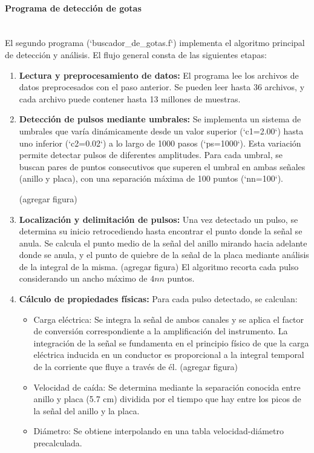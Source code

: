 \documentclass[12pt,a4paper]{article}
\newcommand{\subsubsubsection}[1]{\paragraph{#1}\mbox{}\\}
\begin{document}
\subsubsubsection{Programa de detección de gotas}

El segundo programa (`buscador\_de\_gotas.f`) implementa el algoritmo principal de
detección y análisis. El flujo general consta de las siguientes etapas:

\begin{enumerate}

\item \textbf{Lectura y preprocesamiento de datos:} El programa lee los archivos de datos
preprocesados con el paso anterior. Se pueden leer hasta 36 archivos, y cada archivo puede contener hasta 13 millones de muestras.

\item \textbf{Detección de pulsos mediante umbrales:} Se implementa un sistema de umbrales que varía dinámicamente desde un valor superior (`c1=2.00`) hasta
uno inferior (`c2=0.02`) a lo largo de 1000 pasos (`ps=1000`). Esta variación permite
detectar pulsos de diferentes amplitudes.
Para cada umbral, se buscan pares de puntos consecutivos que superen el umbral en ambas señales (anillo y placa), con una separación máxima de 100 puntos
(`nn=100`).

(agregar figura)

\item \textbf{Localización y delimitación de pulsos:} Una vez detectado un pulso, se determina su inicio retrocediendo hasta encontrar el punto donde la señal se anula. Se
calcula el punto medio de la señal del anillo mirando hacia adelante donde se anula, y el punto de quiebre de la señal de la placa mediante análisis de la integral de la misma. (agregar figura)
El algoritmo recorta cada pulso considerando un ancho máximo de $4nn$ puntos.

\item \textbf{Cálculo de propiedades físicas:} Para cada pulso detectado, se calculan:

\begin{itemize}
    \item Carga eléctrica: Se integra la señal de ambos canales y se aplica el factor de
    conversión correspondiente a la amplificación del instrumento. La integración de la señal se fundamenta en el principio físico de que la carga eléctrica inducida en un conductor es proporcional a la integral temporal de la corriente que fluye a través de él. (agregar figura)
    \item Velocidad de caída: Se determina mediante la separación conocida entre
    anillo y placa (5.7 cm) dividida por el tiempo que hay entre los picos de la señal del anillo y la placa.
    \item Diámetro: Se obtiene interpolando en una tabla velocidad-diámetro precalculada.
\end{itemize}


\end{enumerate}
\end{document}
